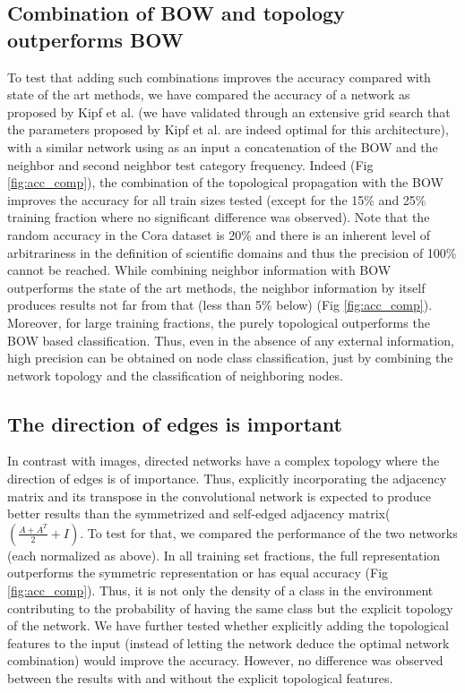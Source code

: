\subsection*{Combination of BOW and topology outperforms BOW}
To test that adding such combinations improves the accuracy compared with state of the art methods, we have compared the accuracy of a network as proposed by Kipf et al. \cite{thomas2016semi} (we have validated through an extensive grid search that the parameters proposed by Kipf et al. are indeed optimal for this architecture), with a similar network using as an input a concatenation of the BOW and the neighbor and second neighbor test category frequency. Indeed (Fig \ref{fig:acc_comp}), the combination of the topological propagation with the BOW improves the accuracy for all train sizes tested (except for the 15\% and 25\% training fraction where no significant difference was observed). Note that the random accuracy in the Cora dataset is 20\% and there is an inherent level of arbitrariness in the definition of scientific domains and thus the precision of 100\% cannot be reached.
While combining neighbor information with BOW outperforms the state of the art methods, the neighbor information by itself produces results not far from that (less than 5\%  below) (Fig \ref{fig:acc_comp}). Moreover, for large training fractions, the purely topological outperforms the BOW based classification. Thus, even in the absence of any external information, high precision can be obtained on node class classification, just by combining the network topology and the classification of neighboring nodes. 

\subsection*{The direction of edges is important}
In contrast with images, directed networks have a complex topology where the direction of edges is of importance. Thus, explicitly incorporating the adjacency matrix and its transpose in the convolutional network is expected to produce better results than the symmetrized and self-edged adjacency matrix($(\frac{A+A^{T}}{2}+I)$. To test for that, we compared the performance of the two networks (each normalized as above). In all training set fractions, the full representation outperforms the symmetric representation or has equal accuracy (Fig \ref{fig:acc_comp}). Thus, it is not only the density of a class in the environment contributing to the probability of having the same class but the explicit topology of the network. We have further tested whether explicitly adding the topological features to the input (instead of letting the network deduce the optimal network combination) would improve the accuracy. However, no difference was observed between the results with and without the explicit topological features.